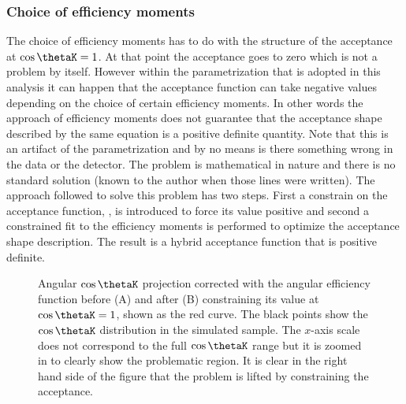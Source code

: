\subsubsection{Choice of efficiency moments}
The choice of efficiency moments has to do with the structure of the acceptance at $\cos\thetaK=1$. At that point the acceptance goes to zero
which is not a problem by itself. However within the parametrization that is adopted in this analysis it can happen that the acceptance function
 can take negative values depending on the choice of certain efficiency moments. In other words the approach of efficiency moments does
not guarantee that the acceptance shape described by the same equation is a positive definite quantity. Note that this is an artifact of the parametrization
and by no means is there something wrong in the data or the detector. The problem is mathematical in nature and there is no standard solution (known
to the author when those lines were written). The approach followed to solve this problem has two steps. First a constrain on the acceptance function, , is 
introduced to force its value positive and second a constrained fit to the efficiency moments is performed to optimize the acceptance shape description.
The result is a hybrid acceptance function that is positive definite.

\begin{figure}[h]
  \centering
  \begin{subfigure}{0.5\textwidth}
    \scalebox{1.3}{}
    \caption{}
    \label{angAcc_nom}
  \end{subfigure}%
  \hfill%
  \begin{subfigure}{0.5\textwidth}
    \scalebox{1.3}{}
    \caption{}
    \label{angAcc_constr_fit}
  \end{subfigure}
  \caption{Angular $\cos\thetaK$ \pdf projection corrected with the angular efficiency function before (A) and after (B) constraining its value at $\cos\thetaK=1$, shown as the red curve. 
           The black points show the $\cos\thetaK$ distribution in the simulated sample. The $x$-axis scale does not correspond to the full $\cos\thetaK$ range but it is zoomed in to 
           clearly show the problematic region. It is clear in the right hand side of the figure that the problem is lifted by constraining the acceptance.
            }
  \label{angAcc_constr}
\end{figure}

